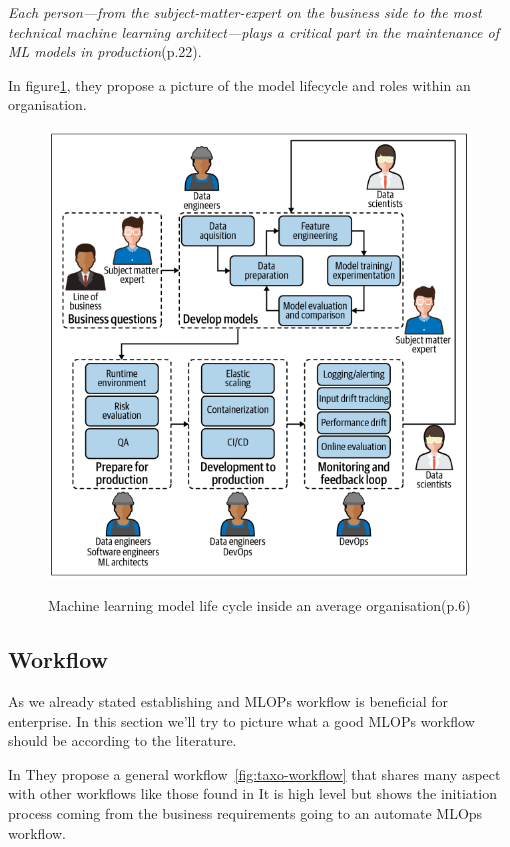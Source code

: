 \textit{Each person—from the subject-matter-expert on the business side to the most
technical machine learning architect—plays a critical part in the maintenance of ML
models in production}\cite{treveil2020introducing}(p.22).

In figure\ref{fig:mlop-people}, they propose a picture of the model lifecycle and roles within an organisation.
\begin{figure}[!htbp]
    \caption{Machine learning model life cycle inside an average
    organisation\cite{treveil2020introducing}(p.6)}
    \centering
    \includegraphics[scale=0.3]{images/mlops-people}
    \label{fig:mlop-people}
\end{figure}

\subsection{Workflow}\label{subsec:workflow}

As we already stated establishing and MLOPs workflow is beneficial for enterprise.
In this section we'll try to picture what a good MLOPs workflow should be according to the literature.

In\cite{9792270} They propose a general workflow~\ref{fig:taxo-workflow} that shares many aspect with other workflows like those found in\cite{treveil2020introducing,gift2021practical}
It is high level but shows the initiation process coming from the business requirements going to an automate MLOps workflow.

